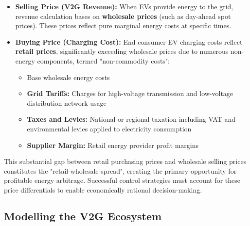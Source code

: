 \begin{itemize}
    \item \textbf{Selling Price (V2G Revenue):} When EVs provide energy to the grid, revenue calculation bases on \textbf{wholesale prices} (such as day-ahead spot prices). These prices reflect pure marginal energy costs at specific times.
    
    \item \textbf{Buying Price (Charging Cost):} End consumer EV charging costs reflect \textbf{retail prices}, significantly exceeding wholesale prices due to numerous non-energy components, termed "non-commodity costs":
    \begin{itemize}
        \item Base wholesale energy costs
        \item \textbf{Grid Tariffs:} Charges for high-voltage transmission and low-voltage distribution network usage
        \item \textbf{Taxes and Levies:} National or regional taxation including VAT and environmental levies applied to electricity consumption
        \item \textbf{Supplier Margin:} Retail energy provider profit margins
    \end{itemize}
\end{itemize}
\noindent
This substantial gap between retail purchasing prices and wholesale selling prices constitutes the "retail-wholesale spread", creating the primary opportunity for profitable energy arbitrage. Successful control strategies must account for these price differentials to enable economically rational decision-making.

\subsection{Modelling the V2G Ecosystem}
\label{sec:ev_and_scenario}

